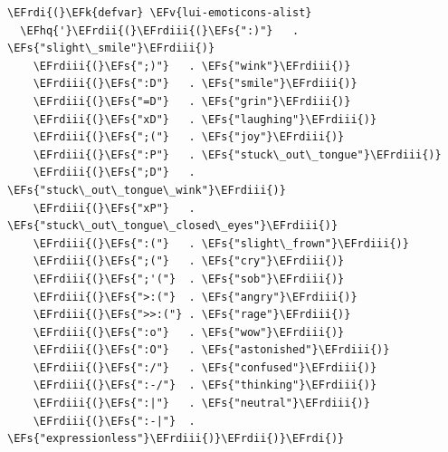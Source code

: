 \documentclass{scrartcl}
\newcommand{\EFk}[1]{\textcolor{EFk}{#1}} %
\newcommand{\EFs}[1]{\textcolor{EFs}{#1}} %
\newcommand{\EFv}[1]{\textcolor{EFv}{#1}} %
\newcommand{\EFhq}[1]{#1} %
\newcommand{\EFrdi}[1]{#1} %
\newcommand{\EFrdii}[1]{#1} %
\newcommand{\EFrdiii}[1]{#1} %
\begin{document}
\begin{Code}
\begin{Verbatim}[]
\EFrdi{(}\EFk{defvar} \EFv{lui-emoticons-alist}
  \EFhq{'}\EFrdii{(}\EFrdiii{(}\EFs{":)"}   . \EFs{"slight\_smile"}\EFrdiii{)}
    \EFrdiii{(}\EFs{";)"}   . \EFs{"wink"}\EFrdiii{)}
    \EFrdiii{(}\EFs{":D"}   . \EFs{"smile"}\EFrdiii{)}
    \EFrdiii{(}\EFs{"=D"}   . \EFs{"grin"}\EFrdiii{)}
    \EFrdiii{(}\EFs{"xD"}   . \EFs{"laughing"}\EFrdiii{)}
    \EFrdiii{(}\EFs{";("}   . \EFs{"joy"}\EFrdiii{)}
    \EFrdiii{(}\EFs{":P"}   . \EFs{"stuck\_out\_tongue"}\EFrdiii{)}
    \EFrdiii{(}\EFs{";D"}   . \EFs{"stuck\_out\_tongue\_wink"}\EFrdiii{)}
    \EFrdiii{(}\EFs{"xP"}   . \EFs{"stuck\_out\_tongue\_closed\_eyes"}\EFrdiii{)}
    \EFrdiii{(}\EFs{":("}   . \EFs{"slight\_frown"}\EFrdiii{)}
    \EFrdiii{(}\EFs{";("}   . \EFs{"cry"}\EFrdiii{)}
    \EFrdiii{(}\EFs{";'("}  . \EFs{"sob"}\EFrdiii{)}
    \EFrdiii{(}\EFs{">:("}  . \EFs{"angry"}\EFrdiii{)}
    \EFrdiii{(}\EFs{">>:("} . \EFs{"rage"}\EFrdiii{)}
    \EFrdiii{(}\EFs{":o"}   . \EFs{"wow"}\EFrdiii{)}
    \EFrdiii{(}\EFs{":O"}   . \EFs{"astonished"}\EFrdiii{)}
    \EFrdiii{(}\EFs{":/"}   . \EFs{"confused"}\EFrdiii{)}
    \EFrdiii{(}\EFs{":-/"}  . \EFs{"thinking"}\EFrdiii{)}
    \EFrdiii{(}\EFs{":|"}   . \EFs{"neutral"}\EFrdiii{)}
    \EFrdiii{(}\EFs{":-|"}  . \EFs{"expressionless"}\EFrdiii{)}\EFrdii{)}\EFrdi{)}
\end{Verbatim}
\end{Code}
\end{document}

